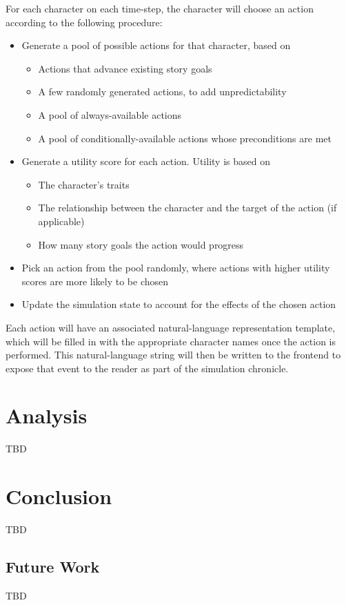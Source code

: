 \documentclass[letterpaper]{article}
\begin{document}
For each character on each time-step, the character will choose an action according to the
following procedure:

\begin{itemize}
    \item Generate a pool of possible actions for that character, based on
        \begin{itemize}
            \item Actions that advance existing story goals
            \item A few randomly generated actions, to add unpredictability
            \item A pool of always-available actions
            \item A pool of conditionally-available actions whose preconditions are met
        \end{itemize}
    \item 
        Generate a utility score for each action. Utility is based on
        \begin{itemize}
            \item The character’s traits
            \item The relationship between the character and the target of the action (if
                applicable)
            \item How many story goals the action would progress
        \end{itemize}
    \item Pick an action from the pool randomly, where actions with higher utility scores
        are more likely to be chosen 
    \item Update the simulation state to account for the effects of the chosen action
\end{itemize}

Each action will have an associated natural-language representation template, which will
be filled in with the appropriate character names once the action is performed. This
natural-language string will then be written to the frontend to expose that event to the
reader as part of the simulation chronicle. 

\section{Analysis}
TBD

\section{Conclusion}
TBD

\subsection{Future Work}
TBD


\end{document}
